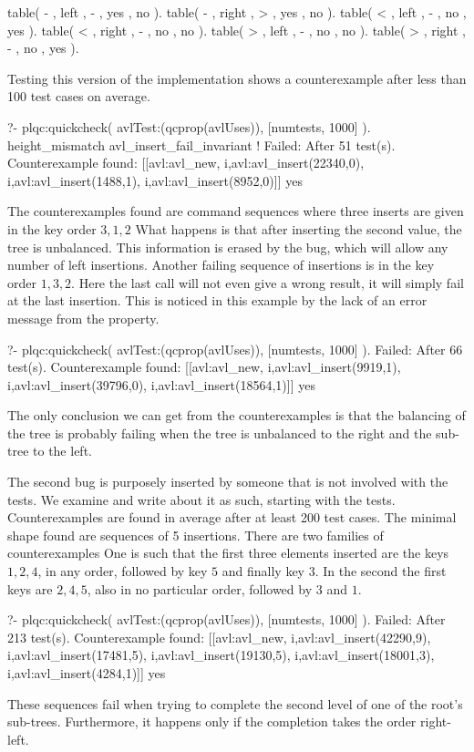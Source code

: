 \begin{yapcode}
 table( -  , left   , -  , yes  , no   ).
 table( -  , right  , >  , yes  , no   ).
 table( <  , left   , -  , no   , yes  ).
 table( <  , right  , -  , no   , no   ).
 table( >  , left   , -  , no   , no   ).
 table( >  , right  , -  , no   , yes  ).
\end{yapcode}
%
%
Testing this version of the implementation shows a counterexample after
less than 100 test cases on average.
%
\begin{yapcode}
   ?- plqc:quickcheck(
                avlTest:(qcprop(avlUses)),
                [{numtests, 1000}] ).
 height_mismatch
 avl_insert_fail_invariant
 !
 Failed: After 51 test(s).
 Counterexample found:
   [[avl:avl_new,
     {i,avl:avl_insert(22340,0)},
     {i,avl:avl_insert(1488,1)},
     {i,avl:avl_insert(8952,0)}]] 
 yes
\end{yapcode}
%
The counterexamples found are command sequences where three inserts are
given in the key order $3, 1, 2$
%
What happens is that after inserting the second value, the tree is
unbalanced.
%
This information is erased by the bug, which will allow any number of
left insertions.
%
Another failing sequence of insertions is in the key order $1, 3, 2$.
%
Here the last call will not even give a wrong result, it will simply
fail at the last insertion.
%
This is noticed in this example by the lack of an error message from the
property.
%
\begin{yapcode}
   ?- plqc:quickcheck(
           avlTest:(qcprop(avlUses)),
           [{numtests, 1000}] ).
 Failed: After 66 test(s).
 Counterexample found:
   [[avl:avl_new,
     {i,avl:avl_insert(9919,1)},
     {i,avl:avl_insert(39796,0)},
     {i,avl:avl_insert(18564,1)}]]
 yes
\end{yapcode}
%
The only conclusion we can get from the counterexamples is that the
balancing of the tree is probably failing when the tree is unbalanced to
the right and the sub-tree to the left.


The second bug is purposely inserted by someone that is not involved
with the tests.
%
We examine and write about it as such, starting with the tests.
%
Counterexamples are found in average after at least 200 test cases.
%
The minimal shape found are sequences of 5 insertions.
%
There are two families of counterexamples
%
One is such that the first three elements inserted are the keys $1, 2,
4$, in any order, followed by key $5$ and finally key $3$.
%
In the second the first keys are $2, 4, 5$, also in no particular order,
followed by $3$ and $1$.
%
\begin{yapcode}
   ?- plqc:quickcheck(
               avlTest:(qcprop(avlUses)),
               [{numtests, 1000}] ).
 Failed: After 213 test(s).
 Counterexample found:
   [[avl:avl_new,
     {i,avl:avl_insert(42290,9)},
     {i,avl:avl_insert(17481,5)},
     {i,avl:avl_insert(19130,5)},
     {i,avl:avl_insert(18001,3)},
     {i,avl:avl_insert(4284,1)}]]
 yes
\end{yapcode}
%
These sequences fail when trying to complete the second level of one of
the root's sub-trees.
%
Furthermore, it happens only if the completion takes the order
right-left.


